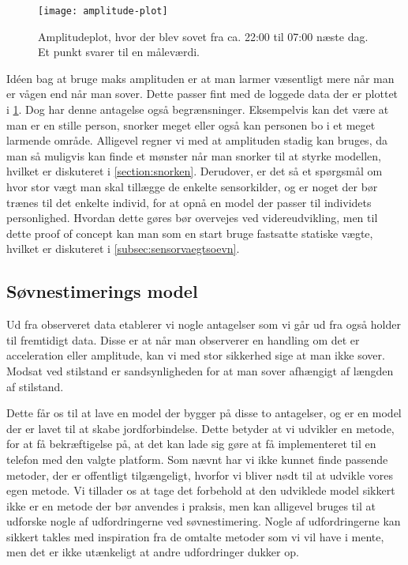\begin{figure}[h]
	\centering
	\texttt{[image: amplitude-plot]}
	\caption{Amplitudeplot, hvor der blev sovet fra ca. 22:00 til 07:00 næste dag. Et punkt svarer til en måleværdi.}\label{fig:amplplot}
\end{figure}

Idéen bag at bruge maks amplituden er at man larmer væsentligt mere når man er vågen end når man sover.
Dette passer fint med de loggede data der er plottet i \cref{fig:amplplot}.
Dog har denne antagelse også begrænsninger.
Eksempelvis kan det være at man er en stille person, snorker meget eller også kan personen bo i et meget larmende område.
Alligevel regner vi med at amplituden stadig kan bruges, da man så muligvis kan finde et mønster når man snorker til at styrke modellen, hvilket er diskuteret i \cref{section:snorken}.
Derudover, er det så et spørgsmål om hvor stor vægt man skal tillægge de enkelte sensorkilder, og er noget der bør trænes til det enkelte individ, for at opnå en model der passer til individets personlighed.
Hvordan dette gøres bør overvejes ved videreudvikling, men til dette proof of concept kan man som en start bruge fastsatte statiske vægte, hvilket er diskuteret i \cref{subsec:sensorvaegtsoevn}.

\subsection{Søvnestimerings model}
Ud fra observeret data etablerer vi nogle antagelser som vi går ud fra også holder til fremtidigt data.
Disse er at når man observerer en handling om det er acceleration eller amplitude, kan vi med stor sikkerhed sige at man ikke sover.
Modsat ved stilstand er sandsynligheden for at man sover afhængigt af længden af stilstand.

Dette får os til at lave en model der bygger på disse to antagelser, og er en model der er lavet til at skabe jordforbindelse.
Dette betyder at vi udvikler en metode, for at få bekræftigelse på, at det kan lade sig gøre at få implementeret til en telefon med den valgte platform.
Som nævnt har vi ikke kunnet finde passende metoder, der er offentligt tilgængeligt, hvorfor vi bliver nødt til at udvikle vores egen metode.
Vi tillader os at tage det forbehold at den udviklede model sikkert ikke er en metode der bør anvendes i praksis, men kan alligevel bruges til at udforske nogle af udfordringerne ved søvnestimering.
Nogle af udfordringerne kan sikkert takles med inspiration fra de omtalte metoder som vi vil have i mente, men det er ikke utænkeligt at andre udfordringer dukker op.

